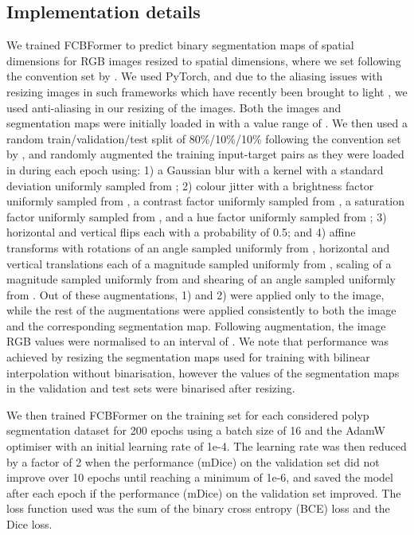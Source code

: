 \documentclass[runningheads]{llncs}
\begin{document}
\subsection{Implementation details}\label{implementation}
We trained FCBFormer to predict binary segmentation maps of  spatial dimensions for RGB images resized to  spatial dimensions, where we set  following the convention set by \cite{pranet,transfuse,ssformer}. We used PyTorch, and due to the aliasing issues with resizing images in such frameworks which have recently been brought to light \cite{aliasresizing}, we used anti-aliasing in our resizing of the images.  Both the images and segmentation maps were initially loaded in with a value range of . We then used a random train/validation/test split of 80\%/10\%/10\% following the convention set by \cite{resunet++,doubleunet,pranet,msrfnet,ssformer}, and randomly augmented the training input-target pairs as they were loaded in during each epoch using: 1) a Gaussian blur with a  kernel with a standard deviation uniformly sampled from ; 2) colour jitter with a brightness factor uniformly sampled from , a contrast factor uniformly sampled from , a saturation factor uniformly sampled from , and a hue factor uniformly sampled from ; 3) horizontal and vertical flips each with a probability of 0.5; and 4) affine transforms with rotations of an angle sampled uniformly from , horizontal and vertical translations each of a magnitude sampled uniformly from , scaling of a magnitude sampled uniformly from  and shearing of an angle sampled uniformly from . Out of these augmentations, 1) and 2) were applied only to the image, while the rest of the augmentations were applied consistently to both the image and the corresponding segmentation map. Following augmentation, the image RGB values were normalised to an interval of . We note that performance was achieved by resizing the segmentation maps used for training with bilinear interpolation without binarisation, however the values of the segmentation maps in the validation and test sets were binarised after resizing.

We then trained FCBFormer on the training set for each considered polyp segmentation dataset for 200 epochs using a batch size of 16 and the AdamW optimiser \cite{adamw} with an initial learning rate of 1e-4. The learning rate was then reduced by a factor of 2 when the performance (mDice) on the validation set did not improve over 10 epochs until reaching a minimum of 1e-6, and saved the model after each epoch if the performance (mDice) on the validation set improved. The loss function used was the sum of the binary cross entropy (BCE) loss and the Dice loss.
\end{document}

